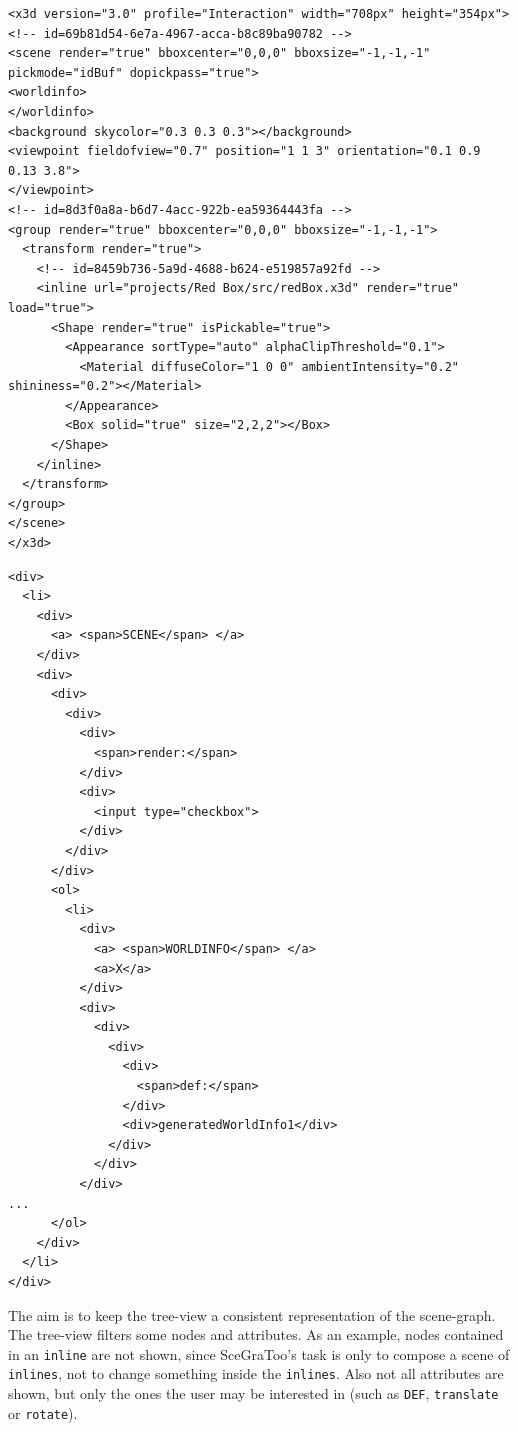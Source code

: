 \begin{listing}
  \begin{verbatim}
<x3d version="3.0" profile="Interaction" width="708px" height="354px">
<!-- id=69b81d54-6e7a-4967-acca-b8c89ba90782 -->
<scene render="true" bboxcenter="0,0,0" bboxsize="-1,-1,-1" pickmode="idBuf" dopickpass="true">
<worldinfo>
</worldinfo>
<background skycolor="0.3 0.3 0.3"></background>
<viewpoint fieldofview="0.7" position="1 1 3" orientation="0.1 0.9 0.13 3.8">
</viewpoint>
<!-- id=8d3f0a8a-b6d7-4acc-922b-ea59364443fa -->
<group render="true" bboxcenter="0,0,0" bboxsize="-1,-1,-1">
  <transform render="true">
    <!-- id=8459b736-5a9d-4688-b624-e519857a92fd -->
    <inline url="projects/Red Box/src/redBox.x3d" render="true" load="true">
      <Shape render="true" isPickable="true">
        <Appearance sortType="auto" alphaClipThreshold="0.1">
          <Material diffuseColor="1 0 0" ambientIntensity="0.2" shininess="0.2"></Material>
        </Appearance>
        <Box solid="true" size="2,2,2"></Box>
      </Shape>
    </inline>
  </transform>
</group>
</scene>
</x3d>
  \end{verbatim}
	\caption{Generated \gls{X3D} example scene.}
	\label{list:x3dscene}
\end{listing}

\begin{listing}
  \begin{verbatim}
<div>
  <li>
    <div>
      <a> <span>SCENE</span> </a>
    </div>
    <div>
      <div>
        <div>
          <div>
            <span>render:</span>
          </div>
          <div>
            <input type="checkbox">
          </div>
        </div>
      </div>
      <ol>
        <li>
          <div>
            <a> <span>WORLDINFO</span> </a>
            <a>X</a>
          </div>
          <div>
            <div>
              <div>
                <div>
                  <span>def:</span>
                </div>
                <div>generatedWorldInfo1</div>
              </div>
            </div>
          </div>
...
      </ol>
    </div>
  </li>
</div>
  \end{verbatim}
  \caption{Simplified tree-view structure.}
  \label{list:tree-view}
\end{listing}

The aim is to keep the tree-view a consistent representation of the scene-graph.
The tree-view filters some nodes and attributes. As an example, nodes contained
in an \texttt{inline} are not shown, since  SceGraToo's task is only to compose
a scene of \texttt{inlines}, not to change something inside the \texttt{inlines}.
Also not all attributes are shown, but only the ones the user may be interested
in (such as \texttt{DEF}, \texttt{translate} or \texttt{rotate}).

